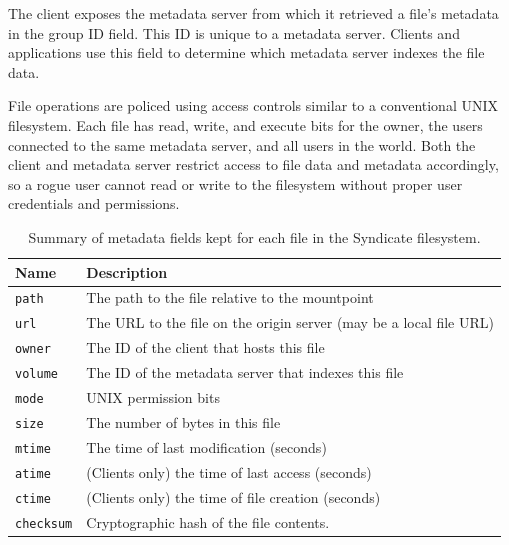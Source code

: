 The client exposes the metadata server from which it retrieved a file's
metadata in the group ID field.  This ID is unique to a metadata server.
Clients and applications use this field to determine which metadata
server indexes the file data.

File operations are policed using access controls similar to a
conventional UNIX filesystem.  Each file has read, write, and execute
bits for the owner, the users connected to the same metadata server,
and all users in the world.  Both the client and metadata server
restrict access to file data and metadata accordingly, so a rogue user
cannot read or write to the filesystem without proper user credentials
and permissions.

\begin{table}[ht!]
\begin{tabular}{ | l | p{14cm} |}
\hline
\textbf{Name} & \textbf{Description} \\
\hline
\texttt{path} & The path to the file relative to the mountpoint \\
\texttt{url}  & The URL to the file on the origin server (may be a local file URL) \\
\texttt{owner} & The ID of the client that hosts this file \\
\texttt{volume} & The ID of the metadata server that indexes this file \\
\texttt{mode} & UNIX permission bits \\
\texttt{size} & The number of bytes in this file \\
\texttt{mtime} & The time of last modification (seconds) \\
\texttt{atime} & (Clients only) the time of last access (seconds) \\
\texttt{ctime} & (Clients only) the time of file creation (seconds) \\
\texttt{checksum} & Cryptographic hash of the file contents. \\
\hline
\end{tabular}
\caption{Summary of metadata fields kept for each file in the Syndicate filesystem.}
\label{tab:metadata-fields}
\end{table}

